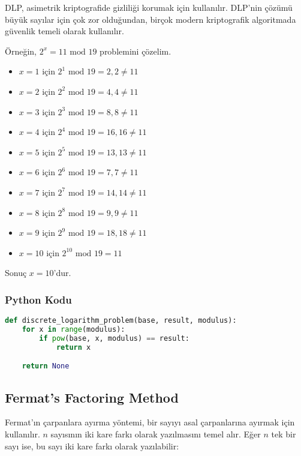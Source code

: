 DLP, asimetrik kriptografide gizliliği korumak için kullanılır. DLP'nin çözümü büyük sayılar için çok zor olduğundan, birçok modern kriptografik algoritmada güvenlik temeli olarak kullanılır. 

Örneğin, $2^x = 11 \text{ mod } 19$ problemini çözelim.

\begin{itemize}
    \item $x = 1$ için $2^1 \text{ mod } 19 = 2, 2 \neq 11$
    \item $x = 2$ için $2^2 \text{ mod } 19 = 4, 4 \neq 11$
    \item $x = 3$ için $2^3 \text{ mod } 19 = 8, 8 \neq 11$
    \item $x = 4$ için $2^4 \text{ mod } 19 = 16, 16 \neq 11$
    \item $x = 5$ için $2^5 \text{ mod } 19 = 13, 13 \neq 11$
    \item $x = 6$ için $2^6 \text{ mod } 19 = 7, 7 \neq 11$
    \item $x = 7$ için $2^7 \text{ mod } 19 = 14, 14 \neq 11$
    \item $x = 8$ için $2^8 \text{ mod } 19 = 9, 9 \neq 11$
    \item $x = 9$ için $2^9 \text{ mod } 19 = 18, 18 \neq 11$
    \item $x = 10$ için $2^10 \text{ mod } 19 = 11$
\end{itemize}

Sonuç $x = 10$'dur.

\subsubsection{Python Kodu}

\begin{lstlisting}[language=Python]
def discrete_logarithm_problem(base, result, modulus):
    for x in range(modulus):
        if pow(base, x, modulus) == result:
            return x

    return None
\end{lstlisting}

\newpage

\subsection{Fermat's Factoring Method}

Fermat'ın çarpanlara ayırma yöntemi, bir sayıyı asal çarpanlarına ayırmak için kullanılır. $n$ sayısının iki kare farkı olarak yazılmasını temel alır. Eğer $n$ tek bir sayı ise, bu sayı iki kare farkı olarak yazılabilir:

